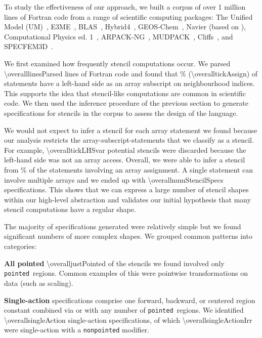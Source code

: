 
\newcommand\regname[1]{\texttt{#1}}
\newcommand\pointed{\regname{pointed}}
\newcommand\forward{\regname{forward}}

To study the effectiveness of our approach,
we built a corpus of over 1 million lines of Fortran code from a
range of scientific computing packages: The Unified Model (UM)~\cite{um},
E3ME~\cite{RePEc:aen:journl:2006se-a12}, BLAS~\cite{blas},
Hybrid4~\cite{GBC:GBC635}, GEOS-Chem~\cite{geos-chem}, Navier (based
on \cite{griebel1997numerical}), Computational Physics
ed. 1~\cite{giordano1997computational},
ARPACK-NG~\cite{arpackng}, MUDPACK~\cite{MUD}, Cliffs~\cite{Cliffs}, and
SPECFEM3D~\cite{specfem3d}.

We first examined how frequently stencil computations occur. We parsed
\num{\overalllinesParsed} lines of Fortran code and found that \overalltickAssignPercent\%
(\num{\overalltickAssign}) of statements have a left-hand side as an
array subscript on neighbourhood indices. This supports the idea that
stencil-like computations are common in scientific code.  We then used
the inference procedure of the previous section to generate
specifications for stencils in the corpus to assess the design of the
language.

We would not expect to infer a stencil for each array statement we
found because our analysis restricts the array-subscript-statements
that we classify as a stencil. For example, \num{\overalltickLHSvar}
potential stencils were discarded because the left-hand side was not
an array access. Overall, we were able to infer a stencil from
\overalltickAssignSuccessPercentOfTickAssign\% of the statements
involving an array assignment. A single statement can involve multiple
arrays and we ended up with \num{\overallnumStencilSpecs}
specifications. This shows that we can express a large number of
stencil shapes within our high-level abstraction and validates our
initial hypothesis that many stencil computations have a regular
shape.

The majority of specifications generated were relatively simple but we
found significant numbers of more complex shapes. We grouped common
patterns into categories:

\textbf{All pointed} \num{\overalljustPointed} of the stencils we
found involved only \pointed\ regions.
Common examples of this were pointwise transformations on data (such
as scaling).

\textbf{Single-action} specifications comprise one
forward, backward, or centered region constant combined via \term{+}
or \term{*} with any number of \pointed\ regions. We identified \num{\overallsingleAction} single-action
specifications, of which \num{\overallsingleActionIrr} were single-action with a
\texttt{nonpointed} modifier.

